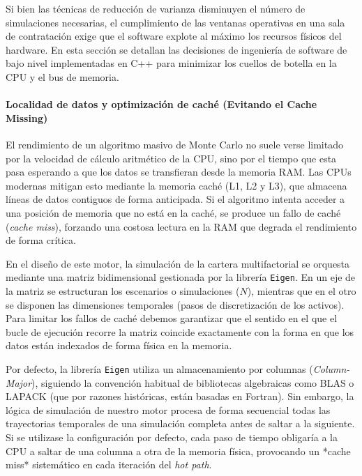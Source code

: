 \documentclass[11pt]{article}
\begin{document}
Si bien las técnicas de reducción de varianza disminuyen el número de simulaciones necesarias, el cumplimiento de las ventanas operativas en una sala de contratación exige que el software explote al máximo los recursos físicos del hardware. En esta sección se detallan las decisiones de ingeniería de software de bajo nivel implementadas en C++ para minimizar los cuellos de botella en la CPU y el bus de memoria.

\paragraph{Localidad de datos y optimización de caché (Evitando el Cache Missing)}

El rendimiento de un algoritmo masivo de Monte Carlo no suele verse limitado por la velocidad de cálculo aritmético de la CPU, sino por el tiempo que esta pasa esperando a que los datos se transfieran desde la memoria RAM. Las CPUs modernas mitigan esto mediante la memoria caché (L1, L2 y L3), que almacena líneas de datos contiguos de forma anticipada. Si el algoritmo intenta acceder a una posición de memoria que no está en la caché, se produce un fallo de caché (\textit{cache miss}), forzando una costosa lectura en la RAM que degrada el rendimiento de forma crítica.

En el diseño de este motor, la simulación de la cartera multifactorial se orquesta mediante una matriz bidimensional gestionada por la librería \texttt{Eigen}. En un eje de la matriz se estructuran los escenarios o simulaciones ($N$), mientras que en el otro se disponen las dimensiones temporales (pasos de discretización de los activos). Para limitar los fallos de caché debemos garantizar que el sentido en el que el bucle de ejecución recorre la matriz coincide exactamente con la forma en que los datos están indexados de forma física en la memoria.

Por defecto, la librería \texttt{Eigen} utiliza un almacenamiento por columnas (\textit{Column-Major}), siguiendo la convención habitual de bibliotecas algebraicas como BLAS o LAPACK (que por razones históricas, están basadas en Fortran). Sin embargo, la lógica de simulación de nuestro motor procesa de forma secuencial todas las trayectorias temporales de una simulación completa antes de saltar a la siguiente. Si se utilizase la configuración por defecto, cada paso de tiempo obligaría a la CPU a saltar de una columna a otra de la memoria física, provocando un *cache miss* sistemático en cada iteración del \textit{hot path}.
\end{document}
